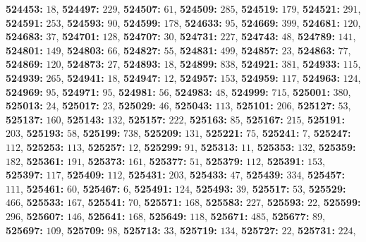 \textsf{\bfseries 524453:} $18$, \textsf{\bfseries 524497:} $229$, \textsf{\bfseries 524507:} $61$, \textsf{\bfseries 524509:} $285$, \textsf{\bfseries 524519:} $179$, \textsf{\bfseries 524521:} $291$, \textsf{\bfseries 524591:} $253$, \textsf{\bfseries 524593:} $90$, \textsf{\bfseries 524599:} $178$, \textsf{\bfseries 524633:} $95$, \textsf{\bfseries 524669:} $399$, \textsf{\bfseries 524681:} $120$, \textsf{\bfseries 524683:} $37$, \textsf{\bfseries 524701:} $128$, \textsf{\bfseries 524707:} $30$, \textsf{\bfseries 524731:} $227$, \textsf{\bfseries 524743:} $48$, \textsf{\bfseries 524789:} $141$, \textsf{\bfseries 524801:} $149$, \textsf{\bfseries 524803:} $66$, \textsf{\bfseries 524827:} $55$, \textsf{\bfseries 524831:} $499$, \textsf{\bfseries 524857:} $23$, \textsf{\bfseries 524863:} $77$, \textsf{\bfseries 524869:} $120$, \textsf{\bfseries 524873:} $27$, \textsf{\bfseries 524893:} $18$, \textsf{\bfseries 524899:} $838$, \textsf{\bfseries 524921:} $381$, \textsf{\bfseries 524933:} $115$, \textsf{\bfseries 524939:} $265$, \textsf{\bfseries 524941:} $18$, \textsf{\bfseries 524947:} $12$, \textsf{\bfseries 524957:} $153$, \textsf{\bfseries 524959:} $117$, \textsf{\bfseries 524963:} $124$, \textsf{\bfseries 524969:} $95$, \textsf{\bfseries 524971:} $95$, \textsf{\bfseries 524981:} $56$, \textsf{\bfseries 524983:} $48$, \textsf{\bfseries 524999:} $715$, \textsf{\bfseries 525001:} $380$, \textsf{\bfseries 525013:} $24$, \textsf{\bfseries 525017:} $23$, \textsf{\bfseries 525029:} $46$, \textsf{\bfseries 525043:} $113$, \textsf{\bfseries 525101:} $206$, \textsf{\bfseries 525127:} $53$, \textsf{\bfseries 525137:} $160$, \textsf{\bfseries 525143:} $132$, \textsf{\bfseries 525157:} $222$, \textsf{\bfseries 525163:} $85$, \textsf{\bfseries 525167:} $215$, \textsf{\bfseries 525191:} $203$, \textsf{\bfseries 525193:} $58$, \textsf{\bfseries 525199:} $738$, \textsf{\bfseries 525209:} $131$, \textsf{\bfseries 525221:} $75$, \textsf{\bfseries 525241:} $7$, \textsf{\bfseries 525247:} $112$, \textsf{\bfseries 525253:} $113$, \textsf{\bfseries 525257:} $12$, \textsf{\bfseries 525299:} $91$, \textsf{\bfseries 525313:} $11$, \textsf{\bfseries 525353:} $132$, \textsf{\bfseries 525359:} $182$, \textsf{\bfseries 525361:} $191$, \textsf{\bfseries 525373:} $161$, \textsf{\bfseries 525377:} $51$, \textsf{\bfseries 525379:} $112$, \textsf{\bfseries 525391:} $153$, \textsf{\bfseries 525397:} $117$, \textsf{\bfseries 525409:} $112$, \textsf{\bfseries 525431:} $203$, \textsf{\bfseries 525433:} $47$, \textsf{\bfseries 525439:} $334$, \textsf{\bfseries 525457:} $111$, \textsf{\bfseries 525461:} $60$, \textsf{\bfseries 525467:} $6$, \textsf{\bfseries 525491:} $124$, \textsf{\bfseries 525493:} $39$, \textsf{\bfseries 525517:} $53$, \textsf{\bfseries 525529:} $466$, \textsf{\bfseries 525533:} $167$, \textsf{\bfseries 525541:} $70$, \textsf{\bfseries 525571:} $168$, \textsf{\bfseries 525583:} $227$, \textsf{\bfseries 525593:} $22$, \textsf{\bfseries 525599:} $296$, \textsf{\bfseries 525607:} $146$, \textsf{\bfseries 525641:} $168$, \textsf{\bfseries 525649:} $118$, \textsf{\bfseries 525671:} $485$, \textsf{\bfseries 525677:} $89$, \textsf{\bfseries 525697:} $109$, \textsf{\bfseries 525709:} $98$, \textsf{\bfseries 525713:} $33$, \textsf{\bfseries 525719:} $134$, \textsf{\bfseries 525727:} $22$, \textsf{\bfseries 525731:} $224$, 
